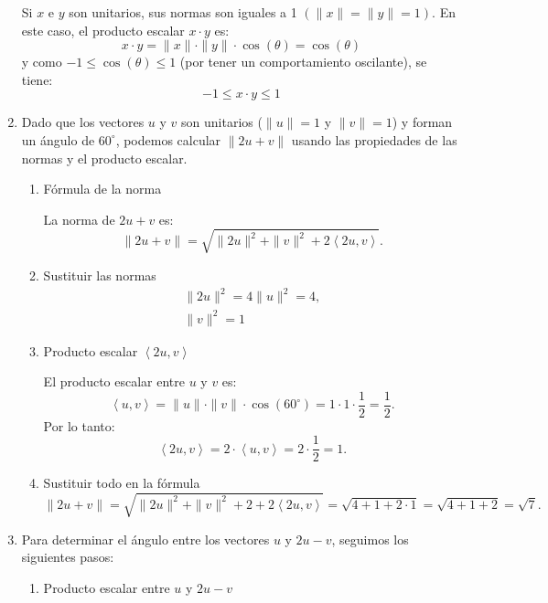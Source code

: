 \begin{enumerate}[label=\color{red}\textbf{\arabic*)}]
    Si $x$ e  $y$ son unitarios, sus normas son iguales a 1 $(\|x\|=\|y\|=1)$. En este caso, el producto escalar  $x\cdot y$ es: \[
    x\cdot y=\|x\|\cdot \|y\|\cdot \cos(\theta)=\cos(\theta)
    \] 
    y como $-1\le \cos(\theta)\le 1$ (por tener un comportamiento oscilante), se tiene: \[
    -1\le x\cdot y\le 1
    \] 
\item {}

    Dado que los vectores $u$ y $v$ son unitarios ($\|u\|=1$ y  $\|v\|=1$) y forman un ángulo de $60^\circ$, podemos calcular  $\|2u+v\|$ usando las propiedades de las normas y el producto escalar.
     \begin{enumerate}[label=Paso \arabic*:]
        \item Fórmula de la norma

            La norma de $2u+v$ es:  \[
            \|2u+v\|=\sqrt{\|2u\|^2+\|v\|^2+2\left<2u,v \right>} .
            \] 
        \item Sustituir las normas
            \[
                \begin{array}{l}
            \|2u\|^2=4\|u\|^2=4,\\
            \|v\|^2=1
                \end{array}
            \] 
        \item Producto escalar $\left<2u,v \right>$ 

            El producto escalar entre $u$ y $v$ es: \[
            \left<u,v \right> = \|u\|\cdot \|v\|\cdot \cos(60^\circ)=1\cdot 1\cdot \dfrac{1}{2}=\dfrac{1}{2}.
            \] 
            Por lo tanto: \[
            \left<2u, v \right> = 2\cdot \left<u,v \right> = 2\cdot \dfrac{1}{2}=1.
            \] 
        \item Sustituir todo en la fórmula \[
        \|2u+v\|=\sqrt{\|2u\|^2+\|v\|^2+2+2\left<2u,v \right>}=\sqrt{4+1+2\cdot 1}=\sqrt{4+1+2}=\sqrt{7}    .
        \] 
        
    \end{enumerate}
\item {} 

    Para determinar el ángulo entre los vectores $u$ y $2u-v$, seguimos los siguientes pasos:
    \begin{enumerate}[label=Paso \arabic*:]
        \item Producto escalar entre $u$ y $2u-v$


\end{enumerate}
\end{enumerate}
